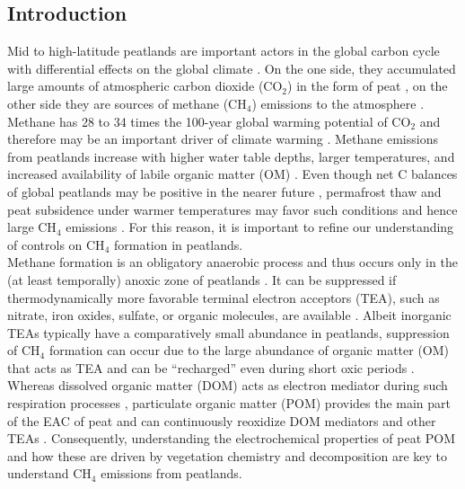\documentclass[alpha-refs]{wiley-article-rmd}
\begin{document}
\begin{refsection}

\hypertarget{introduction}{%
\section{Introduction}\label{introduction}}

Mid to high-latitude peatlands are important actors in the global carbon cycle with differential effects on the global climate \autocite{Frolking.2011}. On the one side, they accumulated large amounts of atmospheric carbon dioxide (CO\(_2\)) in the form of peat \autocite{Limpens.2008}, on the other side they are sources of methane (CH\(_4\)) emissions to the atmosphere \autocite{Limpens.2008,Frolking.2011}.\\
Methane has 28 to 34 times the 100-year global warming potential of CO\(_2\) and therefore may be an important driver of climate warming \autocite{Myhre.2013}. Methane emissions from peatlands increase with higher water table depths, larger temperatures, and increased availability of labile organic matter (OM) \autocite{Moore.1989,Yavitt.1997,Limpens.2008}. Even though net C balances of global peatlands may be positive in the nearer future \autocite{Chaudhary.2020}, permafrost thaw and peat subsidence under warmer temperatures may favor such conditions and hence large CH\(_4\) emissions \autocite{Anisimov.2007,Koven.2011,Frolking.2011}. For this reason, it is important to refine our understanding of controls on CH\(_4\) formation in peatlands.\\
Methane formation is an obligatory anaerobic process and thus occurs only in the (at least temporally) anoxic zone of peatlands \autocite{Limpens.2008}. It can be suppressed if thermodynamically more favorable terminal electron acceptors (TEA), such as nitrate, iron oxides, sulfate, or organic molecules, are available \autocite{Blodau.2011,Klupfel.2014,Gao.2019}. Albeit inorganic TEAs typically have a comparatively small abundance in peatlands, suppression of CH\(_4\) formation can occur due to the large abundance of organic matter (OM) that acts as TEA \autocite{Gao.2019} and can be ``recharged'' even during short oxic periods \autocite{Klupfel.2014,Lau.2016,Walpen.2018b}. Whereas dissolved organic matter (DOM) acts as electron mediator during such respiration processes \autocite{Lau.2016,Gao.2019}, particulate organic matter (POM) provides the main part of the EAC of peat and can continuously reoxidize DOM mediators and other TEAs \autocite{Gao.2019,Blodau.2007}. Consequently, understanding the electrochemical properties of peat POM and how these are driven by vegetation chemistry and decomposition are key to understand CH\(_4\) emissions from peatlands.\\

\end{refsection}
\end{document}

